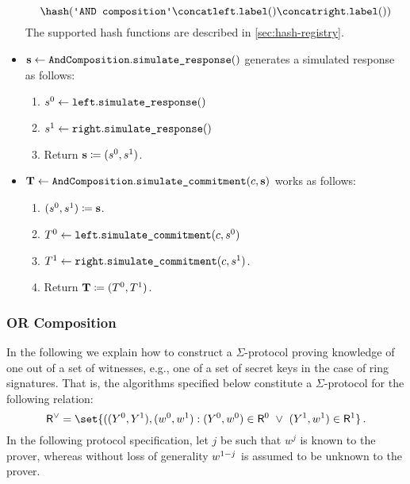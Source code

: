 \documentclass[11pt]{article}
\begin{document}
\begin{itemize}
    \[
     \hash(\andlabel \concat \leftbranch.\labeltt() \concat \rightbranch.\labeltt())
   \]
   The supported hash functions are described in \cref{sec:hash-registry}.
  \item
  $\mathbf {s} \gets \texttt{AndComposition}.\texttt{simulate\_response}()$
   generates a simulated response as follows:
    \begin{enumerate}
      \item
        $s^0\gets\texttt{left}.\texttt{simulate\_response}()$
        \item $s^1\gets\texttt{right}.\texttt{simulate\_response}()$
      \item
        Return $\mathbf {s}\coloneqq(s^0,s^1)$.
    \end{enumerate}
  \item
  $\mathbf {T} \gets \texttt{AndComposition}.\texttt{simulate\_commitment}(c, \mathbf {s})$ works as follows:
    \begin{enumerate}
      \item
        $(s^0,s^1)\coloneqq\mathbf{s}$.
      \item
        $T^0\gets\texttt{left}.\texttt{simulate\_commitment}(c,s^0)$
        \item $T^1\gets\texttt{right}.\texttt{simulate\_commitment}(c,s^1)$.
      \item
        Return $\mathbf {T}\coloneqq(T^0, T^1)$.
      \end{enumerate}
\end{itemize}



\subsubsection{OR Composition}
  In the following we explain how to construct a $\Sigma$-protocol proving knowledge of one out of a set of witnesses, e.g., one of a set of secret keys in the case of ring signatures.
  That is, the algorithms specified below constitute a $\Sigma$-protocol for the following relation:
\[
  \relation^\lor = \set{
    ((\statement^0,\statement^1),(\witness^0,\witness^1) :
    (\statement^0,\witness^0)\in \relation^0 ~\lor~ (\statement^1,\witness^1)\in\relation^1}\,.
\]
  In the following protocol specification, let $j$ be such that $w^j$ is known to the prover, whereas without loss of generality $w^{1-j}$ is assumed to be unknown to the prover.
\end{document}
